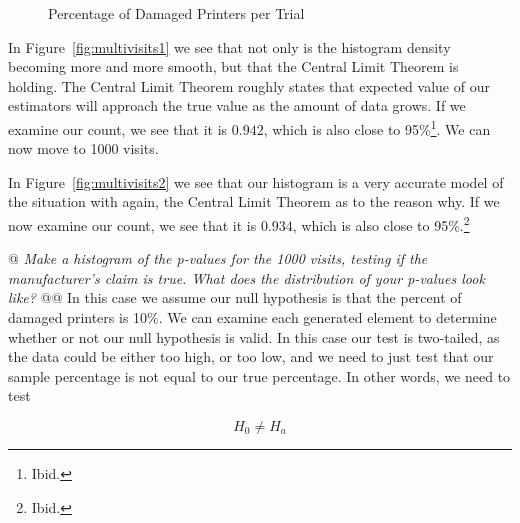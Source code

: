 \documentclass[10pt]{report}\usepackage[]{graphicx}\usepackage[]{xcolor}
\newenvironment{knitrout}{}{} %
\begin{document}
\begin{easylist}[enumerate]
\begin{knitrout}
\begin{figure}[H]
{}

\caption[Percentage of Damaged Printers per Trial]{Percentage of Damaged Printers per Trial}\label{fig:multivisits}
\end{figure}


\end{knitrout}

        In Figure~\ref{fig:multivisits1} we see that not only is the histogram density becoming more and more smooth,
        but that the Central Limit Theorem is holding. The Central Limit Theorem roughly states that expected value of
        our estimators will approach the true value as the amount of data grows. If we examine our count, we see that it
        is $0.942$, which is also close to 95\%\footnote{Ibid.}. We can now move to 1000 visits.
        \newline

        In Figure~\ref{fig:multivisits2} we see that our histogram is a very accurate model of the situation with
        again, the Central Limit Theorem as to the reason why. If we now examine our count, we see that it is
        $0.934$, which is also close to 95\%.\footnote{Ibid.}

        \newpage
        @ \textit{Make a histogram of the p-values for the 1000 visits, testing if the manufacturer's claim is true.
        What does the distribution of your p-values look like?}
        @@ In this case we assume our null hypothesis is that the percent of damaged printers is 10\%. We can examine
        each generated element to determine whether or not our null hypothesis is valid. In this case our test is
        two-tailed, as the data could be either too high, or too low, and we need to just test that our sample
        percentage is not equal to our true percentage. In other words, we need to test

        \[
            H_0 \neq H_a
        \]


\end{easylist}
\end{document}
